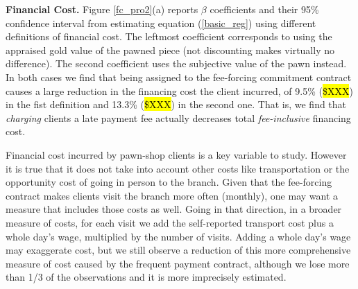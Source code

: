 \documentclass[11pt]{article}
\begin{document}
\vspace{.2in}
\noindent \textbf{Financial Cost.} Figure \ref{fc_pro2}(a) reports $\beta$ coefficients and their 95\% confidence interval from estimating equation (\ref{basic_reg}) using different definitions of financial cost. The leftmost coefficient corresponds to using the appraised gold value of the pawned piece (not discounting makes virtually no difference). The second coefficient uses the subjective value of the pawn instead. In both cases we find that being assigned to the fee-forcing commitment contract causes a large reduction in the financing cost the client incurred, of 9.5\% (\hl{\$XXX}) in the fist definition and 13.3\% (\hl{\$XXX}) in the second one. That is, we find that \textit{charging} clients a late payment fee  actually decreases total \textit{fee-inclusive} financing cost. 

Financial cost incurred by pawn-shop clients is a key variable to study. However it is true that it does not take into account other costs like transportation or the opportunity cost of going in person to the branch. Given that the fee-forcing contract makes clients visit the branch more often (monthly), one may want a measure that includes those costs as well. Going in that direction, in a broader measure of costs, for each visit we add the self-reported transport cost plus a whole day's wage, multiplied by the number of visits. Adding a whole day's wage may exaggerate cost, but we still observe a reduction of this more comprehensive measure of cost caused by the frequent payment contract, although we lose more than 1/3 of the observations and it is more imprecisely estimated. 
\end{document}
